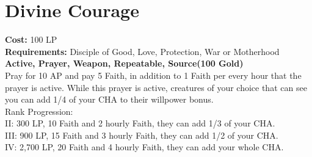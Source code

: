 \section{Divine Courage}\label{prayer:divineCourage}
\textbf{Cost:} 100 LP\\
\textbf{Requirements:} Disciple of Good, Love, Protection, War or Motherhood\\
\textbf{Active, Prayer, Weapon, Repeatable, Source(100 Gold)}\\
Pray for 10 AP and pay 5 Faith, in addition to 1 Faith per every hour that the prayer is active.
While this prayer is active, creatures of your choice that can see you can add 1/4 of your CHA to their willpower bonus.
\\
Rank Progression:\\
II: 300 LP, 10 Faith and 2 hourly Faith, they can add 1/3 of your CHA.\\
III: 900 LP, 15 Faith and 3 hourly Faith, they can add 1/2 of your CHA.\\
IV: 2,700 LP, 20 Faith and 4 hourly Faith, they can add your whole CHA.\\